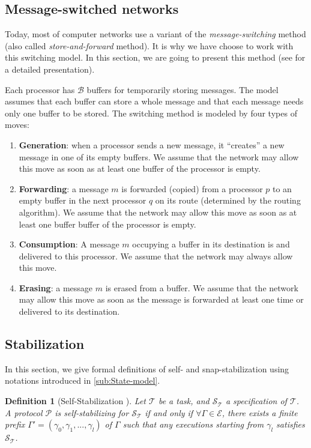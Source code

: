 \documentclass[11pt]{article}
\newtheorem{definition}{Definition}
\begin{document}
\subsection{Message-switched networks}\label{sub:Message-switched-network}

Today, most of computer networks use a variant of the \emph{message-switching} method (also called \emph{store-and-forward} method). It is why we have choose to work with this switching model. In this section, we are going to present this method (see \cite{T01} for a detailed presentation).

Each processor has $\mathcal{B}$ buffers for temporarily storing messages. The model assumes that each buffer can store a whole message and that each message needs only one buffer to be stored. The switching method is modeled by four types of moves:

\begin{enumerate}
\item \textbf{Generation}: when a processor sends a new message, it ``creates'' a new message in one of its empty buffers. We assume that the network may allow this move as soon as at least one buffer of the processor is empty. 
\item \textbf{Forwarding}: a message $m$ is forwarded (copied) from a processor $p$ to an empty buffer in the next processor $q$ on its route (determined by the routing algorithm). We assume that the network may allow this move as soon as at least one buffer buffer of the processor is empty. 
\item \textbf{Consumption}: A message $m$ occupying a buffer in its destination is and delivered to this processor. We assume that the network may always allow this move. 
\item \textbf{Erasing}: a message $m$ is erased from a buffer. We assume that the network may allow this move as soon as the message is forwarded at least one time or delivered to its destination.
\end{enumerate}

\subsection{Stabilization}\label{sub:Stabilization}

In this section, we give formal definitions of self- and snap-stabilization using notations introduced in \ref{sub:State-model}.

\begin{definition} [Self-Stabilization \cite{D74}] \label{def:self}
Let $\mathcal{T}$ be a task, and $\mathcal{\mathcal{S}_{T}}$ a specification of $\mathcal{T}$. A protocol $\mathcal{P}$ is self-stabilizing for $\mathcal{S_{T}}$ if and only if $\forall\Gamma\in\mathcal{E}$, there exists a finite prefix $\Gamma'=(\gamma_{0},\gamma_{1},...,\gamma_{l})$ of $\Gamma$ such that any executions starting from $\gamma_{l}$ satisfies $\mathcal{S_{T}}$.
\end{definition}
\end{document}
